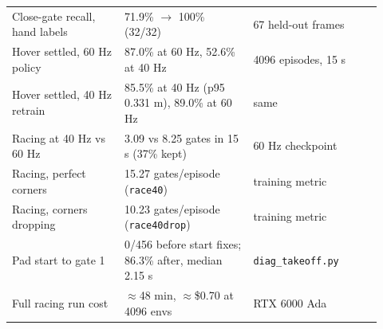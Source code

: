 \documentclass{article}
\begin{document}
\begin{table}[htbp]
\begin{tabular}{@{}p{0.28\linewidth}p{0.32\linewidth}p{0.32\linewidth}@{}}
Close-gate recall, hand labels & 71.9\% $\rightarrow$ 100\% (32/32) & 67 held-out frames \\
Hover settled, 60 Hz policy & 87.0\% at 60 Hz, 52.6\% at 40 Hz & 4096 episodes, 15 s \\
Hover settled, 40 Hz retrain & 85.5\% at 40 Hz (p95 0.331 m), 89.0\% at 60 Hz & same \\
Racing at 40 Hz vs 60 Hz & 3.09 vs 8.25 gates in 15 s (37\% kept) & 60 Hz checkpoint \\
Racing, perfect corners & 15.27 gates/episode (\texttt{race40}) & training metric \\
Racing, corners dropping & 10.23 gates/episode (\texttt{race40drop}) & training metric \\
Pad start to gate 1 & 0/456 before start fixes; 86.3\% after, median 2.15 s & \texttt{diag\_takeoff.py} \\
Full racing run cost & $\approx$48 min, $\approx$\$0.70 at 4096 envs & RTX 6000 Ada \\
\bottomrule
\end{tabular}
\end{table}
\end{document}
